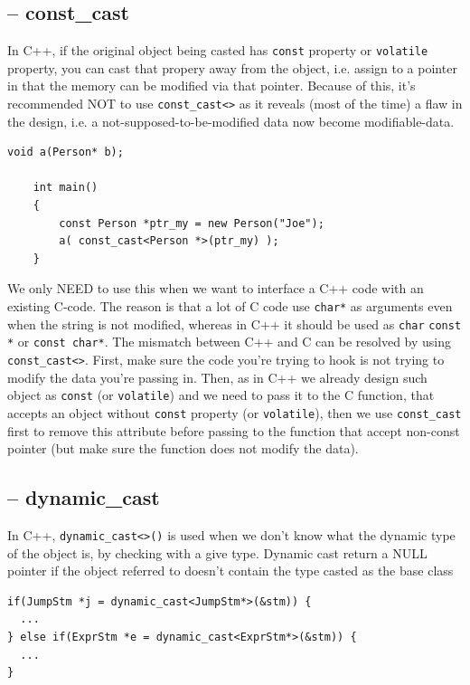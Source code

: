 \subsection{-- const\_cast}
\label{sec:const_cast}

In C++, if the original object being casted has \verb!const! property or
\verb!volatile! property, you can cast that propery away from the object, i.e.
assign to a pointer in that the memory can be modified via that pointer.
Because of this, it's recommended NOT to use \verb!const_cast<>! as it reveals
(most of the time) a flaw in the design, i.e. a not-supposed-to-be-modified
data now become modifiable-data.

\begin{verbatim}
void a(Person* b);

	int main()
	{
		const Person *ptr_my = new Person("Joe");
		a( const_cast<Person *>(ptr_my) );
	}

\end{verbatim}


We only NEED to use this when we want to interface a C++ code with an existing
C-code. The reason is that a lot of C code use \verb!char*! as arguments even
when the string is not modified, whereas in C++ it should be used as \verb!char!
\verb!const *! or \verb!const char*!.  The mismatch between C++ and C can be
resolved by using \verb!const_cast<>!. First, make sure the code you're trying
to hook is not trying to modify the data you're passing in. Then, as in C++ we
already design such object as \verb!const! (or \verb!volatile!) and we need to
pass it to the C function, that accepts an object without \verb!const! property
(or \verb!volatile!), then we use \verb!const_cast! first to remove this
attribute before passing to the function that accept non-const pointer (but
make sure the function does not modify the data).

\subsection{-- dynamic\_cast}
\label{sec:dynamic_cast}

In C++, \verb!dynamic_cast<>()! is used when we don't know what the dynamic type
of the object is, by checking with a give type. Dynamic cast return a NULL
pointer if the object referred to doesn't contain the type casted as the base
class 

\begin{verbatim}
if(JumpStm *j = dynamic_cast<JumpStm*>(&stm)) {
  ...
} else if(ExprStm *e = dynamic_cast<ExprStm*>(&stm)) {
  ...
}
\end{verbatim}

